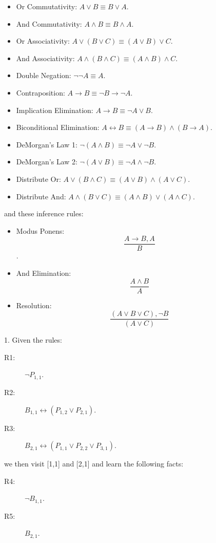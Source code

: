 \documentclass[]{article}
\begin{document}
\begin{itemize}
\item Or Commutativity: $A \vee B \equiv B \vee A$.
\item And Commutativity: $A \wedge B \equiv B \wedge A$.
\item Or Associativity: $A \vee (B \vee C) \equiv (A \vee B) \vee C$.
\item And Associativity: $A \wedge (B \wedge C) \equiv (A \wedge B) \wedge C$.
\item Double Negation: $\neg \neg A \equiv A$.
\item Contraposition: $A \rightarrow B \equiv \neg B \rightarrow \neg A$.
\item Implication Elimination: $A \rightarrow B \equiv \neg A \vee B$.
\item Biconditional Elimination: $A \leftrightarrow B \equiv (A \rightarrow B) \wedge (B \rightarrow A)$.
\item DeMorgan's Law 1: $\neg (A \wedge B) \equiv \neg A \vee \neg B$.
\item DeMorgan's Law 2: $\neg (A \vee B) \equiv \neg A \wedge \neg B$.
\item Distribute Or: $A \vee (B \wedge C) \equiv (A \vee B) \wedge (A \vee C)$.
\item Distribute And: $A \wedge (B \vee C) \equiv (A \wedge B) \vee (A \wedge C)$.
\end{itemize}
and these inference rules:
\begin{itemize}
\item Modus Ponens: \[\frac{A \rightarrow B, A}{B}\].
\item And Elimination: \[\frac{A \wedge B}{A}\]
\item Resolution: \[\frac{(A \vee B \vee C), \neg B}{(A \vee C)}\]
\end{itemize}

\newpage

1.  Given the rules:
\begin{description}
\item[R1:] $\neg P_{1,1}$.
\item[R2:] $B_{1,1} \leftrightarrow (P_{1,2} \vee P_{2,1})$.
\item[R3:] $B_{2,1} \leftrightarrow (P_{1,1} \vee P_{2,2} \vee P_{3,1})$. 
\end{description}

we then visit [1,1] and [2,1] and learn the following facts:
\begin{description}
\item[R4:] $\neg B_{1,1}$.
\item[R5:] $B_{2,1}$.
\end{description}
\end{document}
